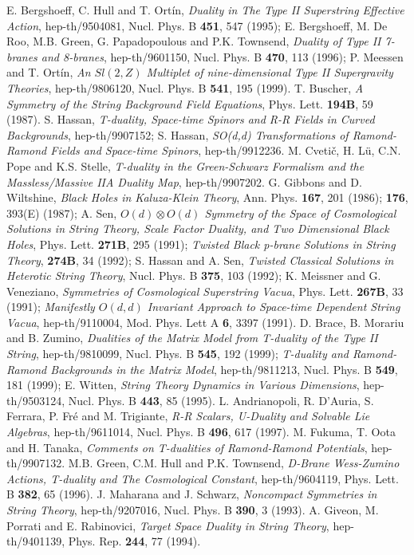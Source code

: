 \documentclass[a4paper,12pt]{article}
\begin{document}
\begin{thebibliography}{d1}
 E. Bergshoeff, C. Hull and T. Ort\'in,
{\it Duality in The Type II Superstring Effective Action}, 
hep-th/9504081, Nucl. Phys. B {\bf 451}, 547 (1995);
E. Bergshoeff, M. De Roo,
M.B. Green, G. Papadopoulous and P.K. Townsend,
{\it Duality of Type II 7-branes and 8-branes},
hep-th/9601150, Nucl. Phys. B {\bf 470}, 113 (1996);
P. Meessen and T. Ort\'{i}n,
{\it An $Sl(2,Z)$ Multiplet of nine-dimensional 
Type II Supergravity Theories}, 
hep-th/9806120, Nucl. Phys. B {\bf 541}, 195 (1999).
 T. Buscher, {\it A Symmetry of the
String Background Field Equations},
Phys. Lett. {\bf 194B}, 59 (1987).
 S. Hassan, {\it T-duality, Space-time Spinors
and R-R Fields in Curved Backgrounds}, hep-th/9907152;
S. Hassan, {\it SO(d,d) Transformations
of Ramond-Ramond Fields and Space-time Spinors}, hep-th/9912236.
 M. Cveti\v c, H. L\"u, C.N. Pope and K.S. Stelle,
{\it T-duality in the Green-Schwarz Formalism 
and the Massless/Massive IIA Duality Map}, hep-th/9907202.
 G. Gibbons and D. Wiltshine, 
{\it Black Holes in Kaluza-Klein Theory}, Ann. Phys. {\bf 167},
201 (1986); {\bf 176}, 393(E) (1987);
A. Sen, {\it $O(d)\otimes O(d)$ Symmetry of the Space
of Cosmological Solutions in String Theory, Scale
Factor Duality, and Two Dimensional Black Holes},
Phys. Lett. {\bf 271B}, 295 (1991);
{\it Twisted Black p-brane Solutions in String Theory},
{\bf 274B}, 34 (1992);
S. Hassan and A. Sen, {\it Twisted Classical Solutions
in Heterotic String Theory},
Nucl. Phys. B {\bf 375}, 103 (1992);
K. Meissner and G. Veneziano, 
{\it Symmetries of Cosmological Superstring Vacua},
Phys. Lett. {\bf 267B}, 33 (1991);
{\it Manifestly $O(d,d)$ Invariant Approach to Space-time
Dependent String Vacua},
hep-th/9110004, Mod. Phys. Lett A {\bf 6}, 3397 (1991).
 D. Brace, B. Morariu and B. Zumino,
{\it Dualities of the Matrix Model from T-duality of the 
Type II String}, hep-th/9810099,
Nucl. Phys. B {\bf 545}, 192 (1999); 
{\it T-duality and Ramond-Ramond Backgrounds in the Matrix Model},
hep-th/9811213, Nucl. Phys. B {\bf 549}, 181 (1999);
E. Witten, {\it String Theory Dynamics in Various Dimensions},
hep-th/9503124, Nucl. Phys. B {\bf 443}, 85 (1995).
L. Andrianopoli, R. D'Auria, S. Ferrara, P. Fr\'e
and M. Trigiante, {\it R-R Scalars, U-Duality
and Solvable Lie Algebras}, hep-th/9611014,
Nucl. Phys. B {\bf 496}, 617 (1997).
 M. Fukuma, T. Oota and H. Tanaka,
{\it Comments on T-dualities of Ramond-Ramond Potentials},
hep-th/9907132.
 M.B. Green, C.M. Hull and P.K. Townsend,
{\it D-Brane Wess-Zumino Actions, T-duality and The Cosmological
Constant}, hep-th/9604119, Phys. Lett. B {\bf 382}, 65 (1996).
 J. Maharana and J. Schwarz, 
{\it Noncompact Symmetries in String Theory}, hep-th/9207016,
Nucl. Phys. B {\bf 390}, 3 (1993).
 A. Giveon, M. Porrati and E. Rabinovici, 
{\it Target Space Duality in String Theory},
hep-th/9401139, Phys. Rep. {\bf 244}, 77 (1994).
\end{thebibliography}  
\end{document}

